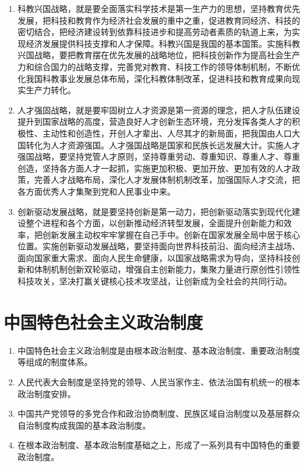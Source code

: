 \documentclass[12pt, a4paper, oneside]{ctexbook}
\begin{document}
\begin{enumerate}
\item 科教兴国战略，就是要全面落实科学技术是第一生产力的思想，坚持教育优先发展，把科技和教育作为经济社会发展的重中之重，促进教育同经济、科技的密切结合，把经济建设转到依靠科技进步和提高劳动者素质的轨道上来，为实现经济发展提供科技支撑和人才保障。科教兴国是我国的基本国策。实施科教兴国战略，要把教育摆在优先发展的战略地位，把科技创新作为提高社会生产力和综合国力的战略支撑，完善党对教育、科技工作的领导体制机制，不断优化我国科教事业发展总体布局，深化科教体制改革，促进科技和教育成果向现实生产力转化。

\item 人才强固战略，就是要牢固树立人才资源是第一资源的理念，把人才队伍建设提升到国家战略的高度，营造良好人才创新生态环境，充分发挥各类人才的积极性、主动性和创造性，开创人才辈出、人尽其才的新局面，把我国由人口大国转化为人才资源强国。人才强国战略是国家和民族长远发展大计。实施人才强国战略，要坚持党管人才原则，坚持尊重劳动、尊重知识、尊重人才、尊重创造，坚持各方面人才一起抓，实施更加积极、更加开放、更加有效的人才政策，完善人才战略布局，深化人才发展体制机制改革，加强国际人才交流，把各方面优秀人才集聚到党和人民事业中来。

\item 创新驱动发展战略，就是要坚持创新是第一动力，把创新驱动落实到现代化建设整个进程和各个方面，以创新推动经济转型发展，全面提升创新能力和效率，把创新发展主动权牢牢掌握在自己手中。创新在国家发展全局中居于核心位置。实施创新驱动发展战略，要坚持面向世界科技前沿、面向经济主战场、面向国家重大需求、面向人民生命健康，以国家战略需求为导向，坚持科技创新和体制机制创新双轮驱动，增强自主创新能力，集聚力量进行原创性引领性科技攻关，坚决打赢关键核心技术攻坚战，让创新成为全社会的共同行动。
\end{enumerate}

\section{中国特色社会主义政治制度}

\begin{enumerate}
\item 中国特色社会主义政治制度是由根本政治制度、基本政治制度、重要政治制度等组成的制度体系。

\item 人民代表大会制度是坚持党的领导、人民当家作主、依法治国有机统一的根本政治制度安排。

\item 中国共产党领导的多党合作和政治协商制度、民族区域自治制度以及基层群众自治制度构成我国的基本政治制度。

\item 在根本政治制度、基本政治制度基础之上，形成了一系列具有中国特色的重要政治制度。
\end{enumerate}
\end{document}
